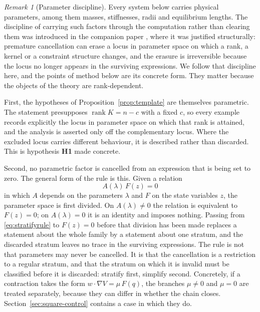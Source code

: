 \documentclass[12pt]{article}
\theoremstyle{plain}
\theoremstyle{definition}
\theoremstyle{remark}
\newtheorem{remark}[theorem]{Remark}
\DeclareMathOperator{\rank}{rank}
\begin{document}
	\begin{remark}[Parameter discipline]
		\label{rem:parameters}
		Every system below carries physical parameters, among them masses,
		stiffnesses, radii and equilibrium lengths. The discipline of carrying such
		factors through the computation rather than clearing them was introduced in
		the companion paper \cite{CLMCP2026}, where it was justified structurally:
		premature cancellation can erase a locus in parameter space on which a rank,
		a kernel or a constraint structure changes, and the erasure is irreversible
		because the locus no longer appears in the surviving expressions. We follow
		that discipline here, and the points of method below are its concrete form.
		They matter because the objects of the theory are rank-dependent.
		
		First, the hypotheses of Proposition~\ref{prop:template} are themselves
		parametric. The statement presupposes $\rank K=n-c$ with a fixed $c$, so
		every example records explicitly the locus in parameter space on which that
		rank is attained, and the analysis is asserted only off the complementary
		locus. Where the excluded locus carries different behaviour, it is described
		rather than discarded. This is hypothesis \textbf{H1} made concrete.
		
		Second, no parametric factor is cancelled from an expression that is being
		set to zero. The general form of the rule is this. Given a relation
		\begin{equation}
			A(\lambda)\,F(z)=0
			\label{eq:stratifyrule}
		\end{equation}
		in which $A$ depends on the parameters $\lambda$ and $F$ on the state
		variables $z$, the parameter space is first divided. On $A(\lambda)\neq0$ the
		relation is equivalent to $F(z)=0$; on $A(\lambda)=0$ it is an identity and
		imposes nothing. Passing from \eqref{eq:stratifyrule} to $F(z)=0$ before that
		division has been made replaces a statement about the whole family by a
		statement about one stratum, and the discarded stratum leaves no trace in the
		surviving expressions. The rule is not that parameters may never be
		cancelled. It is that the cancellation is a restriction to a regular
		stratum, and that the stratum on which it is invalid must be classified
		before it is discarded: stratify first, simplify second. Concretely, if a
		contraction takes the form $w\!\cdot\!\nabla V=\mu\,F(q)$, the branches
		$\mu\neq0$ and $\mu=0$ are treated separately, because they can differ in
		whether the chain closes. Section~\ref{sec:square-control} contains a case
		in which they do.
		

\end{remark}
\end{document}
